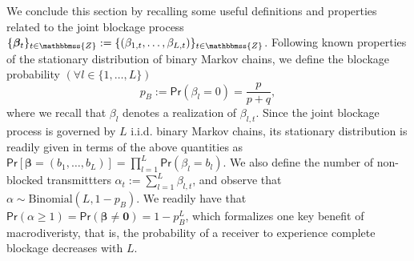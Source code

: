 \documentclass[10pt,journal,a4paper]{IEEEtran}
\newcommand{\eqdef}{:=}
\newcommand{\E}{\mathsf{E}}		%
\renewcommand{\P}{\mathsf{Pr}} 			%
\newcommand{\stdset}[1]{\mathbbmss{#1}}	%
\renewcommand{\vec}[1]{\bm{#1}}		%
\begin{document}
We conclude this section by recalling some useful definitions and properties related to the joint blockage process $\{\vec{\beta}_t\}_{t\in \stdset{Z}}:=\{(\beta_{1,t},\ldots,\beta_{L,t})\}_{t\in \stdset{Z}}$. Following known properties of the stationary distribution of binary Markov chains, we define the blockage probability $(\forall l \in \{1,\ldots,L\})$   
\begin{equation*}
p_B \eqdef \P(\beta_l = 0) = \frac{p}{p+q},
\end{equation*}
where we recall that $\beta_l$ denotes a realization of $\beta_{l,t}$. Since the joint blockage process is governed by $L$ i.i.d. binary Markov chains, its stationary distribution is readily given in terms of the above quantities as $
\P[\vec{\beta} = (b_1,\ldots,b_L)] = \prod_{l=1}^L \P(\beta_l=b_l)$. We also define the number of non-blocked transmittters $\alpha_t := \sum_{l=1}^L\beta_{l,t}$, and observe that $\alpha \sim \text{Binomial}(L,1-p_B)$. We readily have that $
\P(\alpha \geq 1) = \P(\vec{\beta} \neq \vec{0}) = 1-p_B^L$, which formalizes one key benefit of macrodiveristy, that is, the probability of a receiver to experience complete blockage decreases with $L$. 
\end{document}
